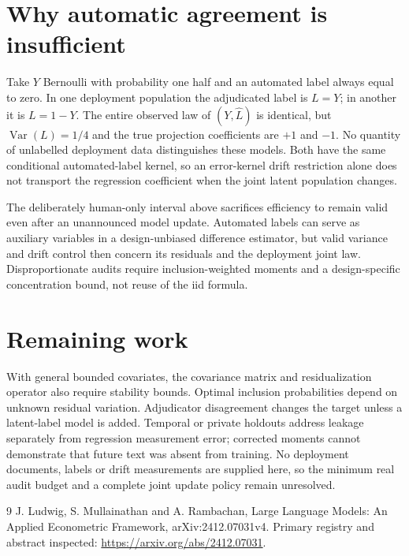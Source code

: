 \documentclass[11pt]{article}
\newcommand{\Var}{\operatorname{Var}}
\begin{document}
\section*{Why automatic agreement is insufficient}
Take $Y$ Bernoulli with probability one half and an automated label always equal to zero. In one deployment population the adjudicated label is $L=Y$; in another it is $L=1-Y$. The entire observed law of $(Y,\widehat L)$ is identical, but $\Var(L)=1/4$ and the true projection coefficients are $+1$ and $-1$. No quantity of unlabelled deployment data distinguishes these models. Both have the same conditional automated-label kernel, so an error-kernel drift restriction alone does not transport the regression coefficient when the joint latent population changes.

The deliberately human-only interval above sacrifices efficiency to remain valid even after an unannounced model update. Automated labels can serve as auxiliary variables in a design-unbiased difference estimator, but valid variance and drift control then concern its residuals and the deployment joint law. Disproportionate audits require inclusion-weighted moments and a design-specific concentration bound, not reuse of the iid formula.

\section*{Remaining work}
With general bounded covariates, the covariance matrix and residualization operator also require stability bounds. Optimal inclusion probabilities depend on unknown residual variation. Adjudicator disagreement changes the target unless a latent-label model is added. Temporal or private holdouts address leakage separately from regression measurement error; corrected moments cannot demonstrate that future text was absent from training. No deployment documents, labels or drift measurements are supplied here, so the minimum real audit budget and a complete joint update policy remain unresolved.
\begin{thebibliography}{9}
 J. Ludwig, S. Mullainathan and A. Rambachan, Large Language Models: An Applied Econometric Framework, arXiv:2412.07031v4. Primary registry and abstract inspected:
\url{https://arxiv.org/abs/2412.07031}.
\end{thebibliography}
\end{document}
